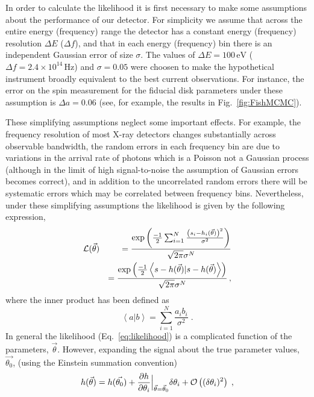 In order to calculate the likelihood it is first necessary to make some assumptions about the performance of our detector. For simplicity we assume that across the entire energy (frequency) range the detector has a constant energy (frequency) resolution $\Delta E$ ($\Delta f$),  and that in each energy (frequency) bin there is an independent Gaussian error of size $\sigma$. The values of $\Delta E = 100\,\textrm{eV}$ ($\Delta f=2.4\times 10^{14}\,\textrm{Hz}$) and $\sigma=0.05$ were choosen to make the hypothetical instrument broadly equivalent to the best current observations. For instance, the error on the spin measurement for the fiducial disk parameters under these assumption is $\Delta a=0.06$ (see, for example, the results in Fig.\ \ref{fig:FishMCMC}).

These simplifying assumptions neglect some important effects. For example, the frequency resolution of most X-ray detectors changes substantially across observable bandwidth, the random errors in each frequency bin are due to variations in the arrival rate of photons which is a Poisson not a Gaussian process (although in the limit of high signal-to-noise the assumption of Gaussian errors becomes correct), and in addition to the uncorrelated random errors there will be systematic errors which may be correlated between frequency bins. Nevertheless, under these simplifying assumptions the likelihood is given by the following expression,
\begin{eqnarray}\label{eq:likelihood} 
&{\cal{L}}(\vec{\theta})&=\frac{\exp\left(\frac{-1}{2}\sum_{i=1}^{N}\frac{\left(s_{i}-h_{i}(\vec{\theta})\right)^{2}}{\sigma^{2}}\right)}{\sqrt{2\pi}\sigma^{N}} \nonumber \\
&&=\frac{\exp\left(\frac{-1}{2}\left<s-h(\vec{\theta})|s-h(\vec{\theta})\right>\right)}{\sqrt{2\pi}\sigma^{N}}\, ,\end{eqnarray}
where the inner product has been defined as
\begin{equation} \left<a|b\right>=\sum_{i=1}^{N}\frac{a_{i}b_{i}}{\sigma^{2}} \; . \end{equation}
In general the likelihood (Eq.~\ref{eq:likelihood}) is a complicated function of the parameters, $\vec{\theta}$. However, expanding the signal about the true parameter values, $\vec{\theta_{0}}$, (using the Einstein summation convention)
\begin{equation}\label{eq:LSA} h(\vec{\theta})=h(\vec{\theta_{0}})+\frac{\partial h}{\partial\theta_{i}}  \Big|_{\vec{\theta}=\vec{\theta}_{0}}  \delta\theta_{i}+{\cal{O}}\left((\delta\theta_{i})^{2}\right)\;,\end{equation}
